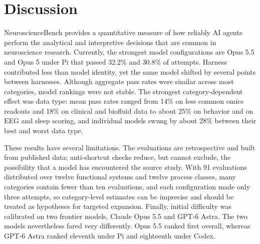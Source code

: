 \section*{Discussion}

NeuroscienceBench provides a quantitative measure of how reliably AI agents perform the analytical and interpretive decisions that are common in neuroscience research. Currently, the strongest model configurations are Opus 5.5 and Opus 5 under Pi that passed 32.2\% and 30.8\% of attempts. Harness contributed less than model identity, yet the same model shifted by several points between harnesses. Although aggregate pass rates were similar across most categories, model rankings were not stable. The strongest category-dependent effect was data type: mean pass rates ranged from 14\% on less common omics readouts and 18\% on clinical and biofluid data to about 25\% on behavior and on EEG and sleep scoring, and individual models swung by about 28\% between their best and worst data type.

These results have several limitations. The evaluations are retrospective and built from published data; anti-shortcut checks reduce, but cannot exclude, the possibility that a model has encountered the source study. With 91 evaluations distributed over twelve functional systems and twelve process classes, many categories contain fewer than ten evaluations, and each configuration made only three attempts, so category-level estimates can be imprecise and should be treated as hypotheses for targeted expansion. Finally, initial difficulty was calibrated on two frontier models, Claude Opus 5.5 and GPT-6 Astra. The two models nevertheless fared very differently. Opus 5.5 ranked first overall, whereas GPT-6 Astra ranked eleventh under Pi and eighteenth under Codex.
